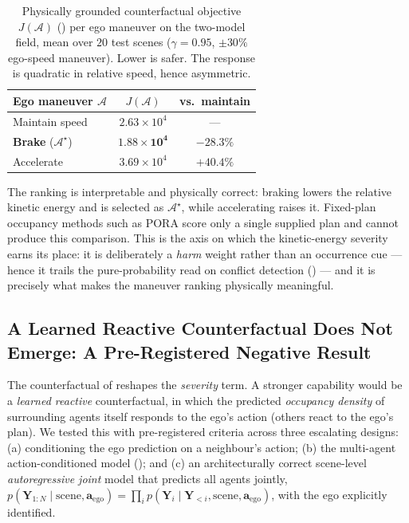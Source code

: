 \documentclass[journal]{IEEEtran}
\begin{document}
\begin{table}[h]
\caption{Physically grounded counterfactual objective $J(\mathcal{A})$ () per ego maneuver on the two-model field, mean over $20$ test scenes ($\gamma=0.95$, $\pm30\%$ ego-speed maneuver). Lower is safer. The response is quadratic in relative speed, hence asymmetric.}
\label{tab:cf}
\centering
\footnotesize
\begin{tabularx}{\columnwidth}{l c c}
\toprule
\textbf{Ego maneuver} $\mathcal{A}$ & $J(\mathcal{A})$ & \textbf{vs.\ maintain} \\
\midrule
Maintain speed          & $2.63\times10^{4}$ & --- \\
\textbf{Brake} ($\mathcal{A}^\star$) & $\mathbf{1.88\times10^{4}}$ & $-28.3\%$ \\
Accelerate              & $3.69\times10^{4}$ & $+40.4\%$ \\
\bottomrule
\end{tabularx}
\end{table}

The ranking is interpretable and physically correct: braking lowers the relative kinetic energy and is selected as $\mathcal{A}^\star$, while accelerating raises it. Fixed-plan occupancy methods such as PORA \cite{wang2025dynamic} score only a single supplied plan and cannot produce this comparison. This is the axis on which the kinetic-energy severity earns its place: it is deliberately a \emph{harm} weight rather than an occurrence cue --- hence it trails the pure-probability read on conflict detection () --- and it is precisely what makes the maneuver ranking physically meaningful.

\subsection{A Learned Reactive Counterfactual Does Not Emerge: A Pre-Registered Negative Result}\label{sec:results_negative}
The counterfactual of  reshapes the \emph{severity} term. A stronger capability would be a \emph{learned reactive} counterfactual, in which the predicted \emph{occupancy density} of surrounding agents itself responds to the ego's action (others react to the ego's plan). We tested this with pre-registered criteria across three escalating designs: (a) conditioning the ego prediction on a neighbour's action; (b) the multi-agent action-conditioned model (); and (c) an architecturally correct scene-level \emph{autoregressive joint} model that predicts all agents jointly, $p(\mathbf{Y}_{1:N}\mid\text{scene},\mathbf{a}_{\mathrm{ego}})=\prod_i p(\mathbf{Y}_i\mid\mathbf{Y}_{<i},\text{scene},\mathbf{a}_{\mathrm{ego}})$, with the ego explicitly identified.
\end{document}
